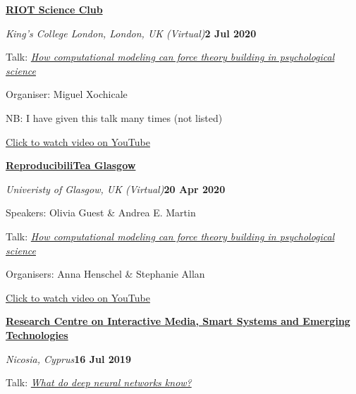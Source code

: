 \documentclass[10pt]{article}
\newenvironment{outerlist}[1][\enskip\textbullet]%
        {\begin{itemize}[#1]}{\end{itemize}%
         \vspace{-.6\baselineskip}}
\newenvironment{innerlist}[1][\enskip\textbullet]%
        {\begin{compactitem}[#1]}{\end{compactitem}}
\begin{document}
\textbf{\href{https://www.kcl.ac.uk/events/series/riot-science-club}{RIOT Science Club}} 
\begin{outerlist}
  \item[] \textit{King's College London, London, UK (Virtual)}\hfill\textbf{2 Jul 2020}
  \begin{innerlist}
    \item Talk: \href{https://youtu.be/IhlF0B_IQJE}{\textit{How computational modeling can force theory building in psychological science}}
    \item Organiser: Miguel Xochicale
    \item NB: I have given this talk many times (not listed)
    \item \href{https://youtu.be/IhlF0B_IQJE}{Click to watch video on YouTube}
  \end{innerlist}
\end{outerlist}
\vspace{8pt}


\textbf{\href{https://github.com/annahensch/Glasgow-ReproducibiliTea}{ReproducibiliTea Glasgow}} 
\begin{outerlist}
  \item[] \textit{Univeristy of Glasgow, UK (Virtual)}\hfill\textbf{20 Apr 2020}
  \begin{innerlist}
    \item Speakers: Olivia Guest \& Andrea E. Martin
    \item Talk: \textit{\href{https://www.youtube.com/watch?v=_WV7EFvFAB8}{How computational modeling can force theory building in psychological science}}
    \item Organisers: Anna Henschel \& Stephanie Allan
    \item \href{https://youtu.be/_WV7EFvFAB8}{Click to watch video on YouTube}

  \end{innerlist}
\end{outerlist}
\vspace{8pt}
\begin{samepage}

\textbf{\href{http://www.rise.org.cy/en-gb/}{Research Centre on Interactive Media, Smart Systems and Emerging Technologies}}
\begin{outerlist}
  \item[] \textit{Nicosia, Cyprus}\hfill\textbf{16 Jul 2019}
  \begin{innerlist}
    \item Talk: \textit{\href{https://dx.doi.org/10.1101/626374}{What do deep neural networks know?}}
  \end{innerlist}
\end{outerlist}
\vspace{8pt}
\end{samepage}
\end{document}
